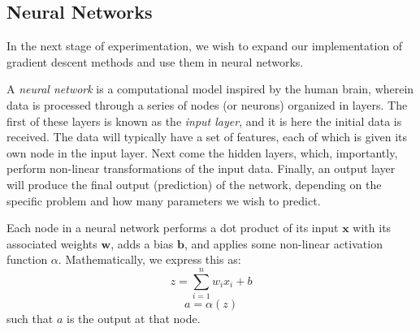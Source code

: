 \subsection{Neural Networks}
In the next stage of experimentation, we wish to expand our implementation of gradient descent methods and use them in neural networks.

A \emph{neural network} is a computational model inspired by the human brain, wherein data is processed through a series of nodes (or neurons) organized in layers. The first of these layers is known as the \emph{input layer}, and it is here the initial data is received. The data will typically have a set of features, each of which is given its own node in the input layer. %
Next come the hidden layers, which, importantly, perform non-linear transformations of the input data. Finally, an output layer will produce the final output (prediction) of the network, depending on the specific problem and how many parameters we wish to predict. %

Each node in a neural network performs a dot product of its input $\boldsymbol{x}$ with its associated weights $\boldsymbol{w}$, adds a bias $\boldsymbol{b}$, and applies some non-linear activation function $\alpha$. Mathematically, we express this as:
\[ z = \sum_{i=1}^{n} w_i x_i + b \]
\[ a = \alpha(z) \]
such that $a$ is the output at that node. 

